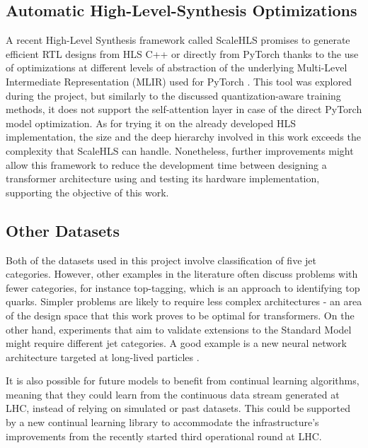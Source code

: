 \subsection{Automatic High-Level-Synthesis Optimizations}
A recent High-Level Synthesis framework called ScaleHLS \cite{ye2021scalehls} promises to generate efficient RTL designs from HLS C++ or directly from PyTorch thanks to the use of optimizations at different levels of abstraction of the underlying Multi-Level Intermediate Representation (MLIR) \cite{mlir} used for PyTorch \cite{86-llvm2020torch-mlir}. This tool was explored during the project, but similarly to the discussed quantization-aware training methods, it does not support the self-attention layer in case of the direct PyTorch model optimization. As for trying it on the already developed HLS implementation, the size and the deep hierarchy involved in this work exceeds the complexity that ScaleHLS can handle. Nonetheless, further improvements might allow this framework to reduce the development time between designing a transformer architecture using \hlsml and testing its hardware implementation, supporting the objective of this work.

\subsection{Other Datasets}
Both of the datasets used in this project involve classification of five jet categories. However, other examples in the literature often discuss problems with fewer categories, for instance top-tagging, which is an approach to identifying top quarks. Simpler problems are likely to require less complex architectures - an area of the design space that this work proves to be optimal for transformers. On the other hand, experiments that aim to validate extensions to the Standard Model might require different jet categories. A good example is a new neural network architecture targeted at long-lived particles \cite{93-apresyan2019deep}.

It is also possible for future models to benefit from continual learning algorithms, meaning that they could learn from the continuous data stream generated at LHC, instead of relying on simulated or past datasets. This could be supported by a new continual learning library \cite{92-lomonaco2021avalanche:} to accommodate the infrastructure's improvements from the recently started third operational round at LHC.
